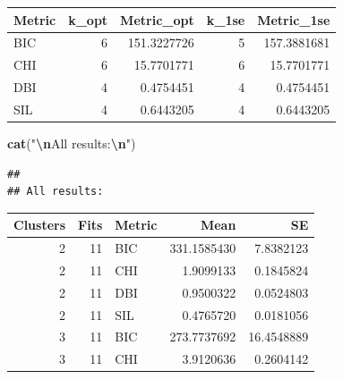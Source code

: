 \documentclass[12pt]{article}
\newenvironment{Shaded}{\begin{snugshade}}{\end{snugshade}}
\newcommand{\FunctionTok}[1]{\textcolor[rgb]{0.13,0.29,0.53}{\textbf{#1}}}
\newcommand{\NormalTok}[1]{#1}
\newcommand{\SpecialCharTok}[1]{\textcolor[rgb]{0.81,0.36,0.00}{\textbf{#1}}}
\newcommand{\StringTok}[1]{\textcolor[rgb]{0.31,0.60,0.02}{#1}}
\begin{document}
\begin{Shaded}
\end{Shaded}

\begin{tabular}{l|r|r|r|r}
\hline
Metric & k\_opt & Metric\_opt & k\_1se & Metric\_1se\\
\hline
BIC & 6 & 151.3227726 & 5 & 157.3881681\\
\hline
CHI & 6 & 15.7701771 & 6 & 15.7701771\\
\hline
DBI & 4 & 0.4754451 & 4 & 0.4754451\\
\hline
SIL & 4 & 0.6443205 & 4 & 0.6443205\\
\hline
\end{tabular}

\begin{Shaded}
\begin{Highlighting}[]
\FunctionTok{cat}\NormalTok{(}\StringTok{"}\SpecialCharTok{\textbackslash{}n}\StringTok{All results:}\SpecialCharTok{\textbackslash{}n}\StringTok{"}\NormalTok{)}
\end{Highlighting}
\end{Shaded}

\begin{verbatim}
## 
## All results:
\end{verbatim}

\begin{Shaded}
\end{Shaded}

\begin{tabular}{r|r|l|r|r}
\hline
Clusters & Fits & Metric & Mean & SE\\
\hline
2 & 11 & BIC & 331.1585430 & 7.8382123\\
\hline
2 & 11 & CHI & 1.9099133 & 0.1845824\\
\hline
2 & 11 & DBI & 0.9500322 & 0.0524803\\
\hline
2 & 11 & SIL & 0.4765720 & 0.0181056\\
\hline
3 & 11 & BIC & 273.7737692 & 16.4548889\\
\hline
3 & 11 & CHI & 3.9120636 & 0.2604142\\
\hline
\end{tabular}
\end{document}
